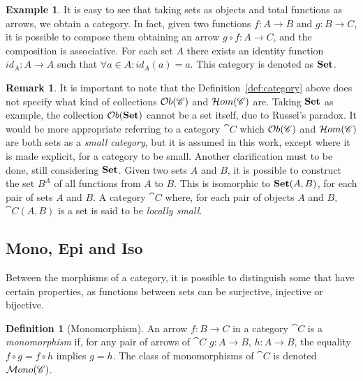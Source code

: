 \documentclass[a4paper, twoside,openright]{report}
\theoremstyle{plain}
\theoremstyle{definition}
\newtheorem{definition}[theorem]{Definition}
\newtheorem{example}[theorem]{Example}
\newtheorem{remark}[theorem]{Remark}
\begin{document}
\begin{example}
    It is easy to see that taking sets as objects and total functions as arrows, we obtain a category. In fact, given two functions $f: A \rightarrow B$ and $g: B \rightarrow C$, it is possible to compose them obtaining an arrow $g \circ f : A \rightarrow C$, and the composition is associative. For each set $A$ there exists an identity function $id_A: A \rightarrow A$ such that $\forall a \in A: id_A(a) = a$.
    This category is denoted as $\mathbf{Set}$.
\end{example}

\begin{remark}\label{rem:small_cats}
    It is important to note that the Definition~\ref{def:category} above does not specify what kind of collections
    $\mathcal{O}b(\mathscr{C})$ and $\mathcal{H}om(\mathscr{C})$ are.
    Taking $\mathbf{Set}$ as example, the collection $\mathcal{O}b(\mathbf{Set})$ cannot be a set itself, due to Russel's paradox. It would be more appropriate referring to a category $\cat{C}$ which $\mathcal{O}b(\mathscr{C})$ and $\mathcal{H}om(\mathscr{C})$ are both sets as a \emph{small category}, but it is assumed in this work, except where it is made explicit, for a category to be small.
    Another clarification must to be done, still considering $\mathbf{Set}$. Given two sets $A$ and $B$, it is possible to construct the set $B^A$ of all functions from $A$ to $B$. This is isomorphic to $\mathbf{Set}(A, B)$, for each pair of sets $A$ and $B$.
    {\color{green}{rivedere}}
    A category $\cat C$ where, for each pair of objects $A$ and $B$, $\cat C (A, B)$ is a set is said to be \emph{locally small}.
\end{remark}

\subsection{Mono, Epi and Iso}\label{ssect:Mono_epi_iso}

Between the morphisms of a category, it is possible to distinguish some that have certain properties, as functions between sets can be surjective, injective or bijective.

\begin{definition}[Monomorphism]\label{def:mono}
    An arrow $f:B\rightarrow C$ in a category $\cat{C}$ is a \emph{monomorphism} if, for any pair of arrows of $\cat{C}$ $g:A \rightarrow B$, $h: A \rightarrow B$, the equality $f \circ g = f \circ h$ implies $g = h$. The class of monomorphisms of $\cat C$ is denoted $\mathcal{M}ono(\mathscr{C})$.
\end{definition}
\end{document}
